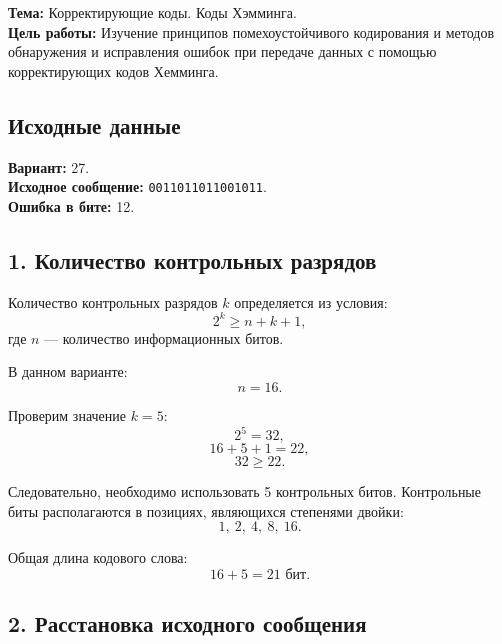 \documentclass[a4paper,12pt]{article}
\begin{document}
\noindent\textbf{Тема:} Корректирующие коды. Коды Хэмминга.\\
\noindent\textbf{Цель работы:} Изучение принципов помехоустойчивого
кодирования и методов обнаружения и исправления ошибок при передаче
данных с помощью корректирующих кодов Хемминга.

\subsection*{Исходные данные}

\noindent\textbf{Вариант:} 27.\\
\textbf{Исходное сообщение:} \texttt{0011011011001011}.\\
\textbf{Ошибка в бите:} 12.

\subsection*{1. Количество контрольных разрядов}

Количество контрольных разрядов $k$ определяется из условия:
$$
2^k \geq n + k + 1,
$$
где $n$ --- количество информационных битов.

В данном варианте:
$$
n = 16.
$$

Проверим значение $k = 5$:
$$
2^5 = 32,
$$
$$
16 + 5 + 1 = 22,
$$
$$
32 \geq 22.
$$

Следовательно, необходимо использовать 5 контрольных битов.
Контрольные биты располагаются в позициях, являющихся степенями двойки:
$$
1,\ 2,\ 4,\ 8,\ 16.
$$

Общая длина кодового слова:
$$
16 + 5 = 21 \text{ бит}.
$$

\subsection*{2. Расстановка исходного сообщения}

\begin{center}
\end{center}
\end{document}
